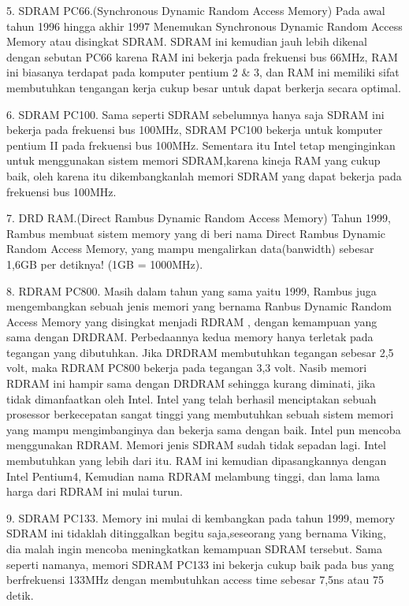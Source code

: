 5.	SDRAM PC66.(Synchronous Dynamic Random Access Memory) Pada awal tahun 1996 hingga akhir 1997 Menemukan Synchronous Dynamic Random Access Memory atau disingkat SDRAM. SDRAM ini kemudian jauh lebih dikenal dengan sebutan PC66 karena RAM ini bekerja pada frekuensi bus 66MHz, RAM ini biasanya terdapat pada komputer pentium 2 \& 3, dan RAM ini memiliki sifat membutuhkan tengangan kerja cukup besar untuk dapat berkerja secara optimal.

6.	SDRAM PC100. Sama seperti SDRAM sebelumnya hanya saja SDRAM ini bekerja pada frekuensi bus 100MHz, SDRAM PC100 bekerja untuk komputer pentium II pada frekuensi bus 100MHz. Sementara itu Intel tetap menginginkan untuk menggunakan sistem memori SDRAM,karena kineja RAM yang cukup baik, oleh karena itu dikembangkanlah memori SDRAM yang dapat bekerja pada frekuensi bus 100MHz.

7.	DRD RAM.(Direct Rambus Dynamic Random Access Memory) Tahun 1999, Rambus membuat sistem memory yang di beri nama Direct Rambus Dynamic Random Access Memory, yang mampu mengalirkan data(banwidth) sebesar 1,6GB per detiknya! (1GB = 1000MHz).

8.	RDRAM PC800. Masih dalam tahun yang sama yaitu 1999, Rambus juga mengembangkan sebuah jenis memori yang bernama Ranbus Dynamic Random Access Memory yang disingkat menjadi RDRAM , dengan kemampuan yang sama dengan DRDRAM. Perbedaannya kedua memory hanya terletak pada tegangan yang dibutuhkan. Jika DRDRAM membutuhkan tegangan sebesar 2,5 volt, maka RDRAM PC800 bekerja pada tegangan 3,3 volt. Nasib memori RDRAM ini hampir sama dengan DRDRAM sehingga kurang diminati, jika tidak dimanfaatkan oleh Intel. Intel yang telah berhasil menciptakan sebuah prosessor berkecepatan sangat tinggi yang membutuhkan sebuah sistem memori yang mampu mengimbanginya dan bekerja sama dengan baik. Intel pun mencoba menggunakan RDRAM. Memori jenis SDRAM sudah tidak sepadan lagi. Intel membutuhkan yang lebih dari itu. RAM ini kemudian dipasangkannya dengan Intel Pentium4, Kemudian nama RDRAM melambung tinggi, dan lama \- lama harga dari RDRAM ini mulai turun.

9.	SDRAM PC133. Memory ini mulai di kembangkan pada tahun 1999, memory SDRAM ini tidaklah ditinggalkan begitu saja,seseorang yang bernama Viking, dia malah ingin mencoba meningkatkan kemampuan SDRAM tersebut. Sama seperti namanya, memori SDRAM PC133 ini bekerja cukup baik pada bus yang berfrekuensi 133MHz dengan membutuhkan access time sebesar 7,5ns atau 75 detik.


